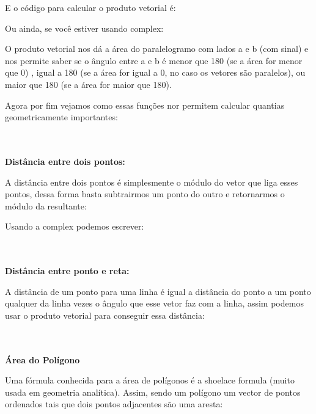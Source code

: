 \documentclass[a4paper,12pt]{article}
\begin{document}
\noindent E o código para calcular o produto vetorial é:


\noindent Ou ainda, se você estiver usando complex:


\noindent O produto vetorial nos dá a área do paralelogramo com lados a e b (com sinal) e nos permite saber se o ângulo entre a e b é menor que 180 (se a área for menor que 0) , igual a 180 (se a área for igual a 0, no caso os vetores são paralelos), ou maior que 180 (se a área for maior que 180).

\noindent Agora por fim vejamos como essas funções nor permitem calcular quantias geometricamente importantes:

\\~\\\noindent\textbf{Distância entre dois pontos:}

\noindent A distância entre dois pontos é simplesmente o módulo do vetor que liga esses pontos, dessa forma basta subtrairmos um ponto do outro e retornarmos o módulo da resultante:


\noindent Usando a complex podemos escrever:


\\~\\\noindent\textbf{Distância entre ponto e reta:}

\noindent A distância de um ponto para uma linha é igual a distância do ponto a um ponto qualquer da linha vezes o ângulo que esse vetor faz com a linha, assim podemos usar o produto vetorial para conseguir essa distância:


\\~\\\noindent\textbf{Área do Polígono}

\noindent Uma fórmula conhecida para a área de polígonos é a shoelace formula (muito usada em geometria analítica). Assim, sendo um polígono um vector de pontos ordenados tais que dois pontos adjacentes são uma aresta:
\end{document}
